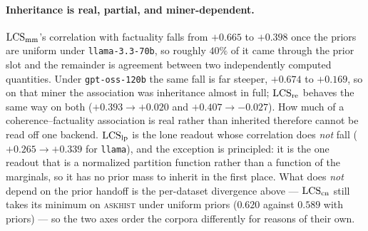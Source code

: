 \paragraph{Inheritance is real, partial, and miner-dependent.} $\mathrm{LCS}_{\mathrm{mm}}$'s correlation with
factuality falls from $+0.665$ to $+0.398$ once the priors are uniform under \texttt{llama-3.3-70b}, so
roughly $40\%$ of it came through the prior slot and the remainder is agreement between two
independently computed quantities. Under \texttt{gpt-oss-120b} the same fall is far steeper, $+0.674$ to
$+0.169$, so on that miner the association was inheritance almost in full; $\mathrm{LCS}_{\mathrm{re}}$ behaves the
same way on both ($+0.393 \to +0.020$ and $+0.407 \to -0.027$). How much of a coherence--factuality
association is real rather than inherited therefore cannot be read off one backend. $\mathrm{LCS}_{\mathrm{lp}}$ is the
lone readout whose correlation does \emph{not} fall ($+0.265 \to +0.339$ for \texttt{llama}), and the
exception is principled: it is the one readout that is a normalized partition function rather than a
function of the marginals, so it has no prior mass to inherit in the first place. What does \emph{not}
depend on the prior handoff is the per-dataset divergence above --- $\mathrm{LCS}_{\mathrm{cn}}$ still takes its
minimum on \textsc{askhist} under uniform priors ($0.620$ against $0.589$ with priors) --- so the two
axes order the corpora differently for reasons of their own.

